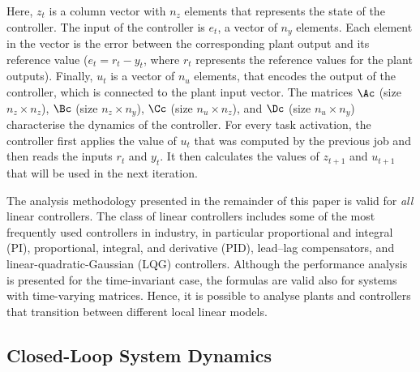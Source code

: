 Here, $z_t$ is a column vector with $n_z$ elements that represents the state of the controller.
The input of the controller is $e_t$, a vector of $n_y$ elements.
Each element in the vector is the error between the corresponding plant output and its reference value ($e_t = r_t - y_t$, where $r_t$ represents the reference values for the plant outputs).
Finally, $u_t$ is a vector of $n_u$ elements, that encodes the output of the controller, which is connected to the plant input vector.
The matrices $\Ac$ (size $n_z \times n_z$), $\Bc$ (size $n_z \times n_y$), $\Cc$ (size $n_u \times n_z$), and $\Dc$ (size $n_u \times n_y$) characterise the dynamics of the controller.
For every task activation, the controller first applies the value of $u_t$ that was computed by the previous job and then reads the inputs $r_t$ and $y_t$.
It then calculates the values of $z_{t+1}$ and $u_{t+1}$ that will be used in the next iteration.

The analysis methodology presented in the remainder of this paper is valid for \emph{all} linear controllers.
The class of linear controllers includes some of the most frequently used controllers in industry, in particular proportional and integral (PI), proportional, integral, and derivative (PID), lead--lag compensators, and linear-quadratic-Gaussian (LQG) controllers.
Although the performance analysis is presented for the time-invariant case, the formulas are valid also for systems with time-varying matrices.
Hence, it is possible to analyse plants and controllers that transition between different local linear models.

\subsection{Closed-Loop System Dynamics}
\label{sec:cldynamics}

